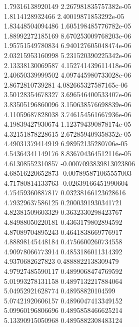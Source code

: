 {1.79316138920149 2.267981835757382e-05 \\
1.8114128932466 2.40019871853292e-05 \\
1.83448504094486 1.605198485776782e-05 \\
1.88992272185169 8.670253009768203e-06 \\
1.95751549780834 6.940127605048474e-06 \\
2.03215953160998 5.231520390225342e-06 \\
2.13338130069587 4.152741439611418e-06 \\
2.40650339999502 4.097445980733028e-06 \\
2.8672810739281 4.082665327587165e-06 \\
3.50128354678327 3.696546400533407e-06 \\
3.83505196860096 3.150638576698839e-06 \\
4.11059687828038 3.746154561667936e-06 \\
4.19839427930674 1.123794390878174e-05 \\
4.32151878228615 2.672859409358352e-05 \\
4.49031379414919 6.98952135280706e-05 \\
4.54364341149176 8.836704364512116e-05 \\
4.61308552310857 -0.0007093839813023806 \\
4.68516220652873 -0.007895871065557003 \\
4.71780814133763 -0.02639166451990604 \\
4.75459360887817 0.03238166123628616 \\
4.79329637586125 0.2000391930341721 \\
4.82381509603329 0.3632330298423767 \\
4.84988050220181 0.4363179802894592 \\
4.87089704895243 0.4641838669776917 \\
4.88898145448184 0.4756600260734558 \\
4.90978066773914 0.4853186011314392 \\
4.9370682627823 0.4888822138309479 \\
4.97927485590117 0.4899068474769592 \\
5.01993278131158 0.4897132217884064 \\
5.04952921628774 0.48958820104599 \\
5.07421920606157 0.4896047413349152 \\
5.09960196806696 0.4895858466625214 \\
5.13390915050968 0.4895882308483124 \\
}
